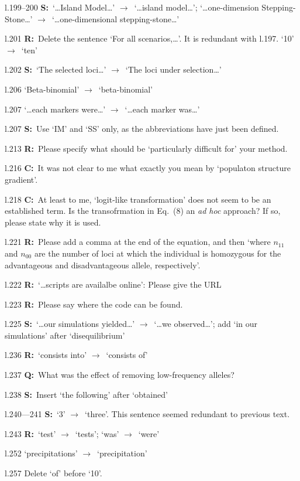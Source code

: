 \documentclass[11pt]{article}
\newenvironment{my_description}
{\begin{description}
  \setlength{\itemsep}{2pt}
  \setlength{\parskip}{0pt}
  \setlength{\parsep}{0pt}}
{\end{description}}
\newcommand{\ra}{$\rightarrow$\ }
\newcommand{\C}{\textbf{C:}\ }
\newcommand{\Q}{\textbf{Q:}\ }
\newcommand{\R}{\textbf{R:}\ }
\newcommand{\V}{\textbf{S:}\ }
\begin{document}
\begin{my_description}
	\item [l.199--200] \V `\dots Island Model\dots' \ra `\dots island model\dots'; `\dots one-dimension Stepping-Stone\dots' \ra `\dots one-dimensional stepping-stone\dots'
	\item [l.201] \R Delete the sentence `For all scenarios,\dots'. It is redundant with l.197. `10' \ra `ten'
	\item [l.202] \V `The selected loci\dots' \ra `The loci under selection\dots'
	\item [l.206] `Beta-binomial' \ra `beta-binomial'
	\item [l.207] `\dots each markers were\dots' \ra `\dots each marker was\dots'
	\item [l.207] \V Use `IM' and `SS' only, as the abbreviations have just been defined.
	\item [l.213] \R Please specify what should be `particularly difficult for' your method.
	\item [l.216] \C It was not clear to me what exactly you mean by `populaton structure gradient'.
	\item [l.218] \C At least to me, `logit-like transformation' does not seem to be an established term. Is the transofrmation in Eq.\ (8) an \emph{ad hoc} approach? If so, please state why it is used.
	\item [l.221] \R Please add a comma at the end of the equation, and then `where $n_{11}$ and $n_{00}$ are the number of loci at which the individual is homozygous for the advantageous and disadvantageous allele, respectively'.
	\item [l.222] \R `\dots scripts are availalbe online': Please give the URL
	\item [l.223] \R Please say where the code can be found.
	\item [l.225] \V `\dots our simulations yielded\dots' \ra `\dots we observed\dots'; add `in our simulations' after `disequilibrium'
	\item [l.236] \R `consists into' \ra `consists of'
	\item [l.237] \Q What was the effect of removing low-frequency alleles?
	\item [l.238] \V Insert `the following' after `obtained'
	\item [l.240---241] \V `3' \ra `three'. This sentence seemed redundant to previous text.
	\item [l.243] \R `test' \ra `tests'; `was' \ra `were'
	\item [l.252] `precipitations' \ra `precipitation'
	\item [l.257] Delete `of' before `10'.
	
\end{my_description}
\end{document}
